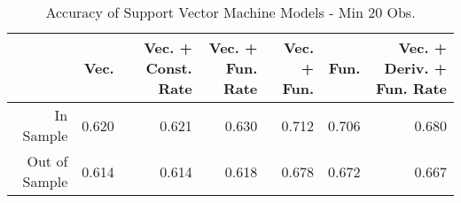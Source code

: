 \begin{table}[ht]
\centering
\begin{tabular}{rrrrrrr}
  \hline
 & Vec. & Vec. + Const. Rate & Vec. + Fun. Rate & Vec. + Fun. & Fun. & Vec. + Deriv. + Fun. Rate \\ 
  \hline
In Sample & 0.620 & 0.621 & 0.630 & 0.712 & 0.706 & 0.680 \\ 
  Out of Sample & 0.614 & 0.614 & 0.618 & 0.678 & 0.672 & 0.667 \\ 
   \hline
\end{tabular}
\caption{Accuracy of Support Vector Machine Models - Min 20 Obs.} 
\label{svm_20obs_acc}
\end{table}
